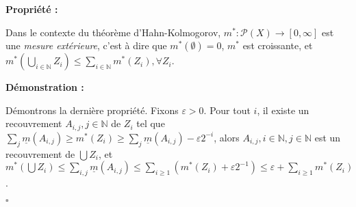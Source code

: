 \documentclass[10pt,a4paper,notitlepage ]{report}
\newcommand{\1}{\mathds 1}
\newcounter{th}
\newenvironment{propriete}[1][]{
	\begin{tcolorbox}
		\textbf{Propriété #1 : }
}
{\end{tcolorbox}}
\newenvironment{demo}[1][]{

	\textbf{Démonstration #1 :}
}{\begin{flushright}
	$\square$
\end{flushright}
}
\begin{document}
\begin{propriete}
	Dans le contexte du théorème d'Hahn-Kolmogorov, $m^* : \mathcal P(X) \rightarrow [0,\infty]$ est une \emph{mesure extérieure}, c'est à dire que $m^*(\emptyset) = 0$, $m^*$ est croissante, et $m^*\left(\underset{i\in \mathbb N} \bigcup Z_i\right) \le \underset{i\in\mathbb N}\sum m^*(Z_i), \forall Z_i$.
\end{propriete}

\begin{demo}
	Démontrons la dernière propriété. Fixons $\varepsilon > 0$. Pour tout $i$, il existe un recouvrement $A_{i,j}, j\in \mathbb N$ de $Z_i$ tel que $\underset j \sum \underline m(A_{i,j}) \ge m^*(Z_i) \ge \underset j \sum \underline m (A_{i,j}) - \varepsilon 2^{-i}$, alors $A_{i,j}, i\in \mathbb N, j \in \mathbb N$ est un recouvrement de $\bigcup Z_i$, et $m^*(\bigcup Z_i) \le \underset {i,j} \sum \underline m (A_{i,j}) \le \underset {i \ge 1} \sum (m^*(Z_i) + \varepsilon 2^{-1}) \le \varepsilon + \underset {i \ge 1} \sum m^*(Z_i)$.
\end{demo}
\end{document}
